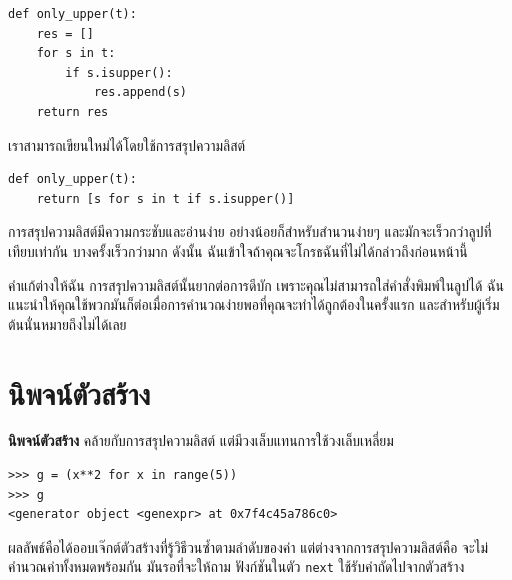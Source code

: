 \begin{verbatim}
def only_upper(t):
    res = []
    for s in t:
        if s.isupper():
            res.append(s)
    return res
\end{verbatim}

เราสามารถเขียนใหม่ได้โดยใช้การสรุปความลิสต์

\begin{verbatim}
def only_upper(t):
    return [s for s in t if s.isupper()]
\end{verbatim}

การสรุปความลิสต์มีความกระชับและอ่านง่าย อย่างน้อยก็สำหรับสำนวนง่ายๆ และมักจะเร็วกว่าลูปที่เทียบเท่ากัน บางครั้งเร็วกว่ามาก ดังนั้น ฉันเข้าใจถ้าคุณจะโกรธฉันที่ไม่ได้กล่าวถึงก่อนหน้านี้

คำแก้ต่างให้ฉัน การสรุปความลิสต์นั้นยากต่อการดีบัก เพราะคุณไม่สามารถใส่คำสั่งพิมพ์ในลูปได้ ฉันแนะนำให้คุณใช้พวกมันก็ต่อเมื่อการคำนวณง่ายพอที่คุณจะทำได้ถูกต้องในครั้งแรก 
และสำหรับผู้เริ่มต้นนั่นหมายถึงไม่ได้เลย



\section{นิพจน์ตัวสร้าง} %

{\bf นิพจน์ตัวสร้าง} คล้ายกับการสรุปความลิสต์ แต่มีวงเล็บแทนการใช้วงเล็บเหลี่ยม

\begin{verbatim}
>>> g = (x**2 for x in range(5))
>>> g
<generator object <genexpr> at 0x7f4c45a786c0>
\end{verbatim}
%
ผลลัพธ์คือได้ออบเจ๊กต์ตัวสร้างที่รู้วิธีวนซ้ำตามลำดับของค่า แต่ต่างจากการสรุปความลิสต์คือ จะไม่คำนวณค่าทั้งหมดพร้อมกัน 
มันรอที่จะให้ถาม ฟังก์ชันในตัว {\tt next} ใช้รับค่าถัดไปจากตัวสร้าง


